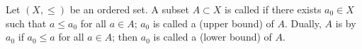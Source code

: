 Let $(X, \leq)$ be an ordered set. A subset $A \subset X$ is called  if there exists $a_0 \in X$ such that $a \leq a_0$ for all $a \in A$; $a_0$ is called a  (upper bound) of $A$. Dually, $A$ is  by $a_0$ if $a_0 \leq a$ for all $a \in A$; then $a_0$ is called a  (lower bound) of $A$.

